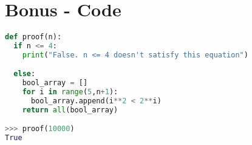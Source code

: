\documentclass{article}
\begin{document}
\section{Bonus - Code}

\begin{lstlisting}[language=Python, caption = This script tests if $n^2 > 2^n$ for a range of a given number greater than 4. A boolean for each iteration is passed to an list. If all booleans in the list are true we know our test has passed.]
def proof(n):
  if n <= 4:
    print("False. n <= 4 doesn't satisfy this equation")

  else:
    bool_array = []
    for i in range(5,n+1):
      bool_array.append(i**2 < 2**i)
    return all(bool_array)

>>> proof(10000)
True

 
\end{lstlisting}
\end{document}
